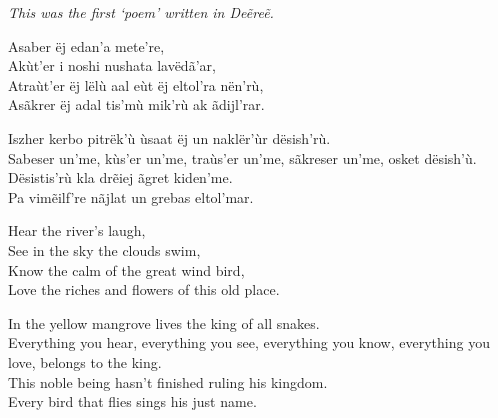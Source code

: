 \label{samp:theKingOfAllSnakes}
\emph{This was the first ‘poem’ written in Deẽreẽ.}

Asaber ëj edan’a mete’re,\\
Akùt’er i noshi nushata lavëdã’ar,\\
Atraùt’er ëj lëlù aal eùt ëj eltol’ra nën’rù,\\
Asãkrer ëj adal tis’mù mik’rù ak ãdijl’rar.

Iszher kerbo pitrëk’ù ùsaat ëj un naklër’ùr dësish’rù.\\
Sabeser un’me, kùs’er un’me, traùs’er un’me, sãkreser un’me, osket dësish’ù.\\
Dësistis’rù kla drẽiej ãgret kiden’me.\\
Pa vimẽilf’re nãjlat un grebas eltol’mar.

Hear the river’s laugh,\\
See in the sky the clouds swim,\\
Know the calm of the great wind bird,\\
Love the riches and flowers of this old place.

In the yellow mangrove lives the king of all snakes.\\
Everything you hear, everything you see, everything you know, everything you love, belongs to the king.\\
This noble being hasn’t finished ruling his kingdom.\\
Every bird that flies sings his just name.

